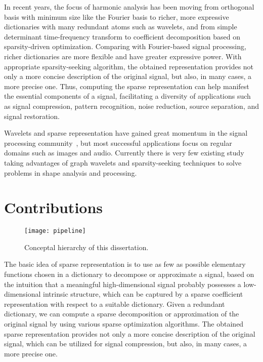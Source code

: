 In recent years, the focus of harmonic analysis has been moving from orthogonal basis with
minimum size like the Fourier basis to richer, more expressive dictionaries with many redundant
atoms such as wavelets, and from simple determinant time-frequency transform to coefficient
decomposition based on sparsity-driven optimization. Comparing with Fourier-based signal processing,
richer dictionaries are more flexible and have greater expressive power. With appropriate
sparsity-seeking algorithm, the obtained representation provides
not only a more concise description of the original signal, but also, in many cases, a more precise one.
Thus, computing the sparse representation can help manifest the essential components of a signal,
facilitating a diversity of applications such as signal compression, pattern recognition,
noise reduction, source separation, and signal restoration.

Wavelets and sparse representation have gained great momentum in the signal processing
community~\cite{Mallat2008}, but most successful applications focus on regular domains
such as images and audio. Currently there is very few existing study taking advantages of
graph wavelets and sparsity-seeking techniques to solve problems in shape analysis and processing.

\section{Contributions}

\begin{figure}
  \centering
  \texttt{[image: pipeline]}
  \caption[Hierarchy of this dissertation]
  {Conceptal hierarchy of this dissertation.}
  \label{fig:thesis_hierarchy}
\end{figure}

The basic idea of sparse representation is to use as few as possible elementary functions chosen
in a dictionary to decompose or approximate a signal, based on the intuition that a meaningful
high-dimensional signal probably possesses a low-dimensional intrinsic structure, which can be
captured by a sparse coefficient representation with respect to a suitable dictionary. Given a
redundant dictionary, we can compute a sparse decomposition or approximation of the original signal
by using various sparse optimization algorithms. The obtained sparse representation provides not
only a more concise description of the original signal, which can be utilized for signal compression,
but also, in many cases, a more precise one.

